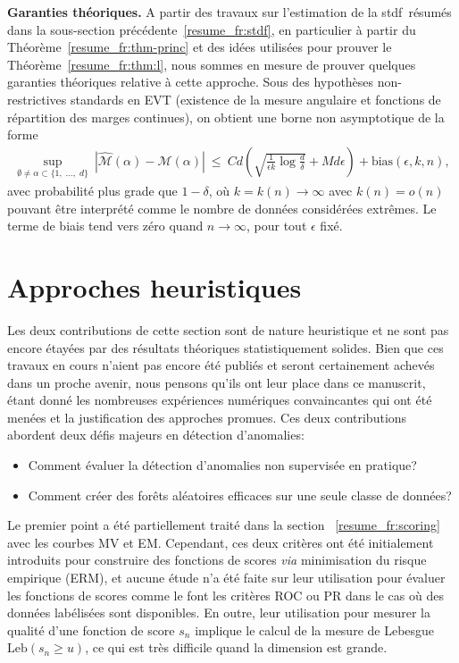 \documentclass[a4paper, 12pt]{article}
\def\stdf{{\sc stdf}}
\def\leb{\text{Leb}}
\begin{document}
\textbf{Garanties théoriques.}
A partir des travaux sur l'estimation de la \stdf~résumés dans la sous-section précédente~\ref{resume_fr:stdf}, en particulier à partir du Théorème~\ref{resume_fr:thm-princ} et des idées utilisées pour prouver le Théorème~\ref{resume_fr:thm:l}, nous sommes en mesure de prouver quelques garanties théoriques relative à cette approche.
%
Sous des hypothèses non-restrictives standards en EVT (existence de la mesure angulaire et fonctions de répartition des marges continues), on obtient une borne non asymptotique de la forme
\begin{align*}
\sup_{\emptyset \neq \alpha \subset \{1,\; \ldots,\; d \}}~ |\widehat{\mathcal{M}}(\alpha)- \mathcal{M}(\alpha)|
~\le~  C d \left( \sqrt{ \frac{1}{\epsilon k}\log\frac{d}{\delta}} + M d\epsilon \right) + \text{bias}(\epsilon, k, n),
\end{align*}
avec probabilité plus grade que $1-\delta$, où $k = k(n) \to \infty$ avec $k(n) = o(n)$ pouvant être interprété comme le nombre de données considérées extrêmes.
Le terme de biais tend vers zéro quand $n \to \infty$, pour tout $\epsilon$ fixé.


\section{Approches heuristiques}
\label{resume_fr:sec:heuristic}

Les deux contributions de cette section sont de nature heuristique et ne sont pas encore étayées par des résultats théoriques statistiquement solides. Bien que ces travaux en cours n'aient pas encore été publiés et seront certainement achevés dans un proche avenir, nous pensons qu'ils ont leur place dans ce manuscrit, étant donné les nombreuses expériences numériques convaincantes qui ont été menées et la justification des approches promues.
%
Ces deux contributions abordent deux défis majeurs en détection d'anomalies:

\begin{itemize}
\item Comment évaluer la détection d'anomalies non supervisée en pratique?
\item Comment créer des forêts aléatoires efficaces sur une seule classe de données?
\end{itemize}

Le premier point a été partiellement traité dans la section ~\ref{resume_fr:scoring} avec les courbes MV et EM.
Cependant, ces deux critères ont été initialement introduits pour construire des fonctions de scores \emph{via} minimisation du risque empirique (ERM), et aucune étude n'a été faite sur leur utilisation pour évaluer les fonctions de scores comme le font les critères ROC ou PR dans le cas où des données labélisées sont disponibles.
En outre, leur utilisation pour mesurer la qualité d'une fonction de score $s_n$ implique le calcul de la mesure de Lebesgue $\leb(s_n\ge u) $, ce qui est très difficile quand la dimension est grande.
\end{document}
